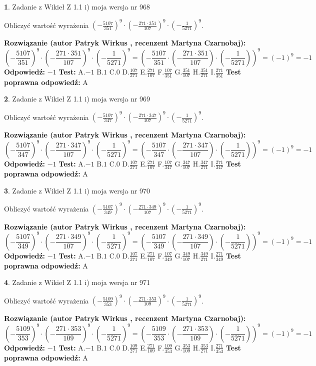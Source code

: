 \documentclass[12pt, a4paper]{article}
\theoremstyle{definition} %
\newtheorem{zad}{}
\newcommand{\zadStart}[1]{\begin{zad}#1\newline}
\newcommand{\zadStop}{\end{zad}}
\newcommand{\rozwStart}[2]{\noindent \textbf{Rozwiązanie (autor #1 , recenzent #2): }\newline}
\newcommand{\rozwStop}{\newline}
\newcommand{\odpStart}{\noindent \textbf{Odpowiedź:}\newline}
\newcommand{\odpStop}{\newline}
\newcommand{\testStart}{\noindent \textbf{Test:}\newline}
\newcommand{\testStop}{\newline}
\newcommand{\kluczStart}{\noindent \textbf{Test poprawna odpowiedź:}\newline}
\newcommand{\kluczStop}{\newline}
\begin{document}
\zadStart{Zadanie z Wikieł Z 1.1 i) moja wersja nr 968}

Obliczyć wartość wyrażenia $(-\frac{5107}{351})^{9} \cdot (-\frac{271 \cdot 351}{107})^{9} \cdot (-\frac{1}{5271})^{9}$.
\zadStop
\rozwStart{Patryk Wirkus}{Martyna Czarnobaj}
$$(-\frac{5107}{351})^{9} \cdot (-\frac{271 \cdot 351}{107})^{9} \cdot (-\frac{1}{5271})^{9} = (-\frac{5107}{351} \cdot (-\frac{271 \cdot 351}{107}) \cdot (-\frac{1}{5271}))^{9} = (-1)^{9} = -1$$
\rozwStop
\odpStart
$-1$
\odpStop
\testStart
A.$-1$ B.$1$ C.$0$ D.$\frac{107}{271}$ E.$\frac{271}{107}$
F.$\frac{107}{351}$ G.$\frac{351}{107}$
H.$\frac{351}{271}$
I.$\frac{271}{351}$
\testStop
\kluczStart
A
\kluczStop



\zadStart{Zadanie z Wikieł Z 1.1 i) moja wersja nr 969}

Obliczyć wartość wyrażenia $(-\frac{5107}{347})^{9} \cdot (-\frac{271 \cdot 347}{107})^{9} \cdot (-\frac{1}{5271})^{9}$.
\zadStop
\rozwStart{Patryk Wirkus}{Martyna Czarnobaj}
$$(-\frac{5107}{347})^{9} \cdot (-\frac{271 \cdot 347}{107})^{9} \cdot (-\frac{1}{5271})^{9} = (-\frac{5107}{347} \cdot (-\frac{271 \cdot 347}{107}) \cdot (-\frac{1}{5271}))^{9} = (-1)^{9} = -1$$
\rozwStop
\odpStart
$-1$
\odpStop
\testStart
A.$-1$ B.$1$ C.$0$ D.$\frac{107}{271}$ E.$\frac{271}{107}$
F.$\frac{107}{347}$ G.$\frac{347}{107}$
H.$\frac{347}{271}$
I.$\frac{271}{347}$
\testStop
\kluczStart
A
\kluczStop



\zadStart{Zadanie z Wikieł Z 1.1 i) moja wersja nr 970}

Obliczyć wartość wyrażenia $(-\frac{5107}{349})^{9} \cdot (-\frac{271 \cdot 349}{107})^{9} \cdot (-\frac{1}{5271})^{9}$.
\zadStop
\rozwStart{Patryk Wirkus}{Martyna Czarnobaj}
$$(-\frac{5107}{349})^{9} \cdot (-\frac{271 \cdot 349}{107})^{9} \cdot (-\frac{1}{5271})^{9} = (-\frac{5107}{349} \cdot (-\frac{271 \cdot 349}{107}) \cdot (-\frac{1}{5271}))^{9} = (-1)^{9} = -1$$
\rozwStop
\odpStart
$-1$
\odpStop
\testStart
A.$-1$ B.$1$ C.$0$ D.$\frac{107}{271}$ E.$\frac{271}{107}$
F.$\frac{107}{349}$ G.$\frac{349}{107}$
H.$\frac{349}{271}$
I.$\frac{271}{349}$
\testStop
\kluczStart
A
\kluczStop



\zadStart{Zadanie z Wikieł Z 1.1 i) moja wersja nr 971}

Obliczyć wartość wyrażenia $(-\frac{5109}{353})^{9} \cdot (-\frac{271 \cdot 353}{109})^{9} \cdot (-\frac{1}{5271})^{9}$.
\zadStop
\rozwStart{Patryk Wirkus}{Martyna Czarnobaj}
$$(-\frac{5109}{353})^{9} \cdot (-\frac{271 \cdot 353}{109})^{9} \cdot (-\frac{1}{5271})^{9} = (-\frac{5109}{353} \cdot (-\frac{271 \cdot 353}{109}) \cdot (-\frac{1}{5271}))^{9} = (-1)^{9} = -1$$
\rozwStop
\odpStart
$-1$
\odpStop
\testStart
A.$-1$ B.$1$ C.$0$ D.$\frac{109}{271}$ E.$\frac{271}{109}$
F.$\frac{109}{353}$ G.$\frac{353}{109}$
H.$\frac{353}{271}$
I.$\frac{271}{353}$
\testStop
\kluczStart
A
\kluczStop
\end{document}
